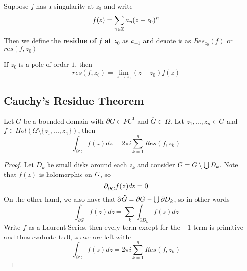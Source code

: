 \begin{definition}
    Suppose $f$ has a singularity at $z_0$ and write
    \[f(z) = \sum_{n \in \mathbb{Z}} a_n (z - z_0)^n\]
    Then we define the \textbf{residue of $f$ at $z_0$} as $a_{-1}$ and denote is as $Res_{z_0}(f)$ or $res(f, z_0)$
\end{definition}

\begin{remark}
If $z_0$ is a pole of order $1$, then
\[res(f, z_0) = \lim_{z \to z_0} (z - z_0)f(z)\]
\end{remark}

\subsection{Cauchy's Residue Theorem}

\begin{theorem}
Let $G$ be a bounded domain with $\partial G \in PC^1$ and $\overline{G} \subset \Omega$. Let $z_1, ..., z_n \in G$ and $f \in Hol(\Omega \setminus \{z_1, ..., z_n\})$, then
\[\int_{\partial G} f(z) dz = 2\pi i \sum_{k = 1}^n Res(f, z_k)\]
\end{theorem}

\begin{proof}
Let $D_k$ be small disks around each $z_k$ and consider $\Tilde{G} = G \setminus \bigcup D_k$. Note that $f(z)$ is holomorphic on $\Tilde{G}$, so
\[\partial_{\partial \Tilde{G}} f(z) dz = 0\]
On the other hand, we also have that $\partial \Tilde{G} = \partial G - \bigcup \partial D_k$, so in other words
\[\int_{\partial G} f(z) dz = \sum_k \int_{\partial D_k} f(z) dz\]
Write $f$ as a Laurent Series, then every term except for the $-1$ term is primitive and thus evaluate to $0$, so we are left with:
\[\int_{\partial G} f(z) dz = 2\pi i \sum_{k = 1}^n Res(f, z_k)\]
\end{proof}